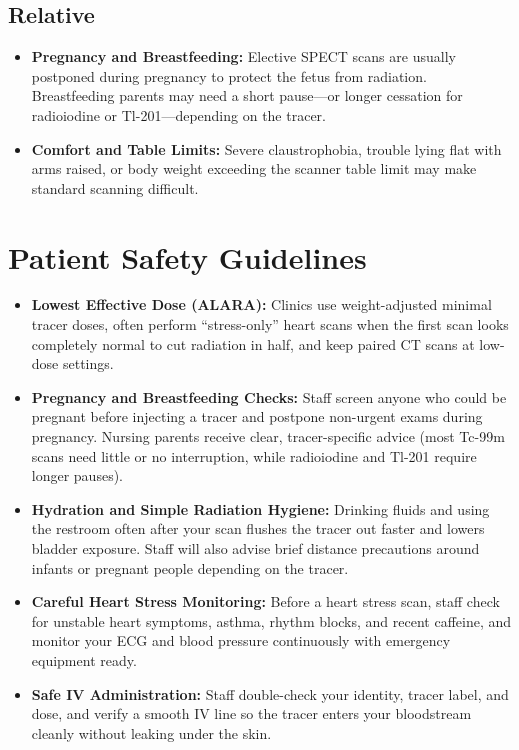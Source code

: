 \subsection{Relative}

\begin{itemize}
    \item \textbf{Pregnancy and Breastfeeding:} Elective SPECT scans are usually postponed during pregnancy to protect the fetus from radiation. Breastfeeding parents may need a short pause---or longer cessation for radioiodine or Tl-201---depending on the tracer.
    \item \textbf{Comfort and Table Limits:} Severe claustrophobia, trouble lying flat with arms raised, or body weight exceeding the scanner table limit may make standard scanning difficult.
\end{itemize}

\section{Patient Safety Guidelines}

\begin{itemize}
    \item \textbf{Lowest Effective Dose (ALARA):} Clinics use weight-adjusted minimal tracer doses, often perform ``stress-only'' heart scans when the first scan looks completely normal to cut radiation in half, and keep paired CT scans at low-dose settings.
    \item \textbf{Pregnancy and Breastfeeding Checks:} Staff screen anyone who could be pregnant before injecting a tracer and postpone non-urgent exams during pregnancy. Nursing parents receive clear, tracer-specific advice (most Tc-99m scans need little or no interruption, while radioiodine and Tl-201 require longer pauses).
    \item \textbf{Hydration and Simple Radiation Hygiene:} Drinking fluids and using the restroom often after your scan flushes the tracer out faster and lowers bladder exposure. Staff will also advise brief distance precautions around infants or pregnant people depending on the tracer.
    \item \textbf{Careful Heart Stress Monitoring:} Before a heart stress scan, staff check for unstable heart symptoms, asthma, rhythm blocks, and recent caffeine, and monitor your ECG and blood pressure continuously with emergency equipment ready.
    \item \textbf{Safe IV Administration:} Staff double-check your identity, tracer label, and dose, and verify a smooth IV line so the tracer enters your bloodstream cleanly without leaking under the skin.
\end{itemize}

